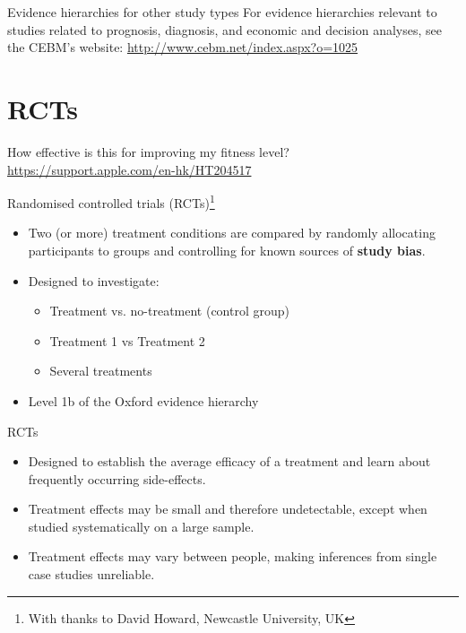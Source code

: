 \documentclass{beamer}
\begin{document}
% 
\begin{frame}{Evidence hierarchies for other study types}
For evidence hierarchies relevant to studies related to prognosis, diagnosis, and economic and decision analyses, see the CEBM's website: 
\url{http://www.cebm.net/index.aspx?o=1025}
\end{frame}

\section*{RCTs}

%
\begin{frame}
\center{\Huge{\textcolor{darkgray}{RCTs}}}
\end{frame}

%
\begin{frame}{How effective is this for improving my fitness level?}
\url{https://support.apple.com/en-hk/HT204517}
\end{frame}

% 
\begin{frame}{Randomised controlled trials (RCTs)\footnote{\scriptsize{With thanks to David Howard, Newcastle University, UK}}}
	\begin{itemize}
	\item Two (or more) treatment conditions are compared by randomly allocating participants to groups and controlling for known sources of \textbf{study bias}.
	\item Designed to investigate:
		\begin{itemize}
		\item Treatment vs. no-treatment (control group)
		\item Treatment 1 vs Treatment 2
		\item Several treatments 
		\end{itemize}
	\item Level 1b of the Oxford evidence hierarchy
	\end {itemize}
\end{frame}

% 
\begin{frame}{RCTs}
	\begin{itemize}
	\item Designed to establish the average efficacy of a treatment and learn about frequently occurring side-effects.
	\item Treatment effects may be small and therefore undetectable, except when studied systematically on a large sample.
	\item Treatment effects may vary between people, making inferences from single case studies unreliable.
	\end {itemize}
\end{frame}
\end{document}
